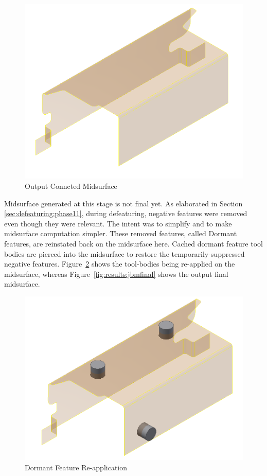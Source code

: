 \begin{figure}[!h]
\centering     %
\includegraphics[width=0.62\linewidth,valign=t]{images/JBM_UBracket_midsurf_before_dormant_model}
\caption{Output Conncted Midsurface}
\label{fig:results:jbmmidsurf}
\end{figure}


Midsurface generated at this stage is not final yet. As elaborated in Section \ref{sec:defeaturing:phase11}, during defeaturing, negative features were removed even though they were relevant. The intent was to simplify and to make midsurface computation simpler. These removed features, called Dormant features, are reinstated back on the midsurface here. Cached dormant feature tool bodies are pierced into the midsurface to restore the temporarily-suppressed  negative features. Figure~\ref{fig:results:jbmdormant} shows the tool-bodies being re-applied on the midsurface, whereas Figure~\ref{fig:results:jbmfinal} shows the output final midsurface.


\begin{figure}[!h]
\centering     %
\includegraphics[width=0.62\linewidth,valign=t]{images/JBM_UBracket_midsurf_dormant_model}
\caption{Dormant Feature Re-application}
\label{fig:results:jbmdormant}
\end{figure}

